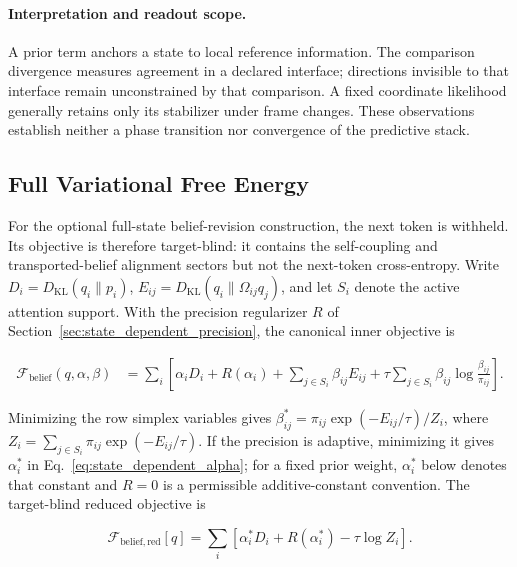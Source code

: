 \documentclass[twoside,11pt]{article}
\begin{document}
\paragraph{Interpretation and readout scope.}
\label{sec:symmetry_breaking}
A prior term anchors a state to local reference information. The comparison divergence measures agreement in a declared interface; directions invisible to that interface remain unconstrained by that comparison. A fixed coordinate likelihood generally retains only its stabilizer under frame changes. These observations establish neither a phase transition nor convergence of the predictive stack.
\subsection{Full Variational Free Energy}
\label{sec:supp_full_vfe}

For the optional full-state belief-revision construction, the next token is withheld. Its objective is therefore target-blind: it contains the self-coupling and transported-belief alignment sectors but not the next-token cross-entropy. Write $D_i=D_{\mathrm{KL}}(q_i\|p_i)$, $E_{ij}=D_{\mathrm{KL}}(q_i\|\Omega_{ij}q_j)$, and let $S_i$ denote the active attention support. With the precision regularizer $R$ of Section~\ref{sec:state_dependent_precision}, the canonical inner objective is

\begin{equation}
\begin{aligned}
\mathcal{F}_{\mathrm{belief}}(q,\alpha,\beta)
&=\sum_i\left[
\alpha_iD_i+R(\alpha_i)
+\sum_{j\in S_i}\beta_{ij}E_{ij}
+\tau\sum_{j\in S_i}\beta_{ij}\log\frac{\beta_{ij}}{\pi_{ij}}
\right].
\end{aligned}
\label{eq:free_energy_belief}
\end{equation}

Minimizing the row simplex variables gives $\beta_{ij}^*=\pi_{ij}\exp(-E_{ij}/\tau)/Z_i$, where $Z_i=\sum_{j\in S_i}\pi_{ij}\exp(-E_{ij}/\tau)$. If the precision is adaptive, minimizing it gives $\alpha_i^*$ in Eq.~\eqref{eq:state_dependent_alpha}; for a fixed prior weight, $\alpha_i^*$ below denotes that constant and $R=0$ is a permissible additive-constant convention. The target-blind reduced objective is

\begin{equation}
\boxed{
\mathcal{F}_{\mathrm{belief,red}}[q]
=\sum_i\left[
\alpha_i^*D_i+R(\alpha_i^*)-\tau\log Z_i
\right].
}
\label{eq:free_energy_belief_red}
\end{equation}
\end{document}
